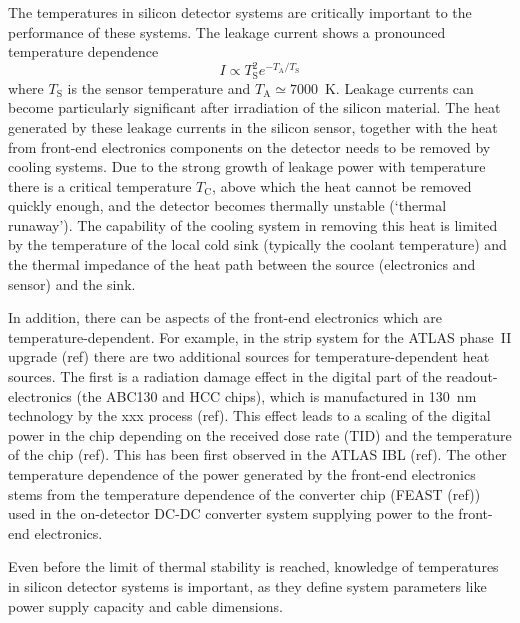 The temperatures in silicon detector systems are critically important to the performance of these systems. The leakage current shows a pronounced temperature dependence 
\begin{equation}
I\propto T_\text{S}^2e^{-T_\text{A}/T_\text{S}}
\end{equation}
where $T_\text{S}$ is the sensor temperature and $T_\text{A}\simeq7000$~K. Leakage currents can become particularly significant after irradiation of the silicon material. The heat generated by these leakage currents in the silicon sensor, together with the heat from front-end electronics components on the detector needs to be removed by cooling systems. Due to the strong growth of leakage power with temperature there is a critical temperature $T_\text{C}$, above which the heat cannot be removed quickly enough, and the detector becomes thermally unstable (`thermal runaway'). The capability of the cooling system in removing this heat is limited by the temperature of the local cold sink (typically the coolant temperature) and the thermal impedance of the heat path between the source (electronics and sensor) and the sink.

In addition, there can be aspects of the front-end electronics which are temperature-dependent. For example, in the strip system for the ATLAS phase~II upgrade (ref) there are two additional sources for temperature-dependent heat sources. The first is a radiation damage effect in the digital part of the readout-electronics (the ABC130 and HCC chips), which is manufactured in 130~nm technology by the xxx process (ref). This effect leads to a scaling of the digital power in the chip depending on the received dose rate (TID) and the temperature of the chip (ref). This has been first observed in the ATLAS IBL (ref). The other temperature dependence of the power generated by the front-end electronics stems from the temperature dependence of the converter chip (FEAST (ref)) used in the on-detector DC-DC converter system supplying power to the front-end electronics. 

Even before the limit of thermal stability is reached, knowledge of temperatures in silicon detector systems is important, as they define system parameters like power supply capacity and cable dimensions.

